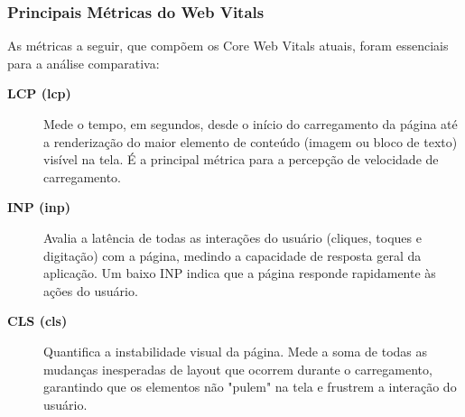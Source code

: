 \subsubsection{Principais Métricas do Web Vitals}
As métricas a seguir, que compõem os Core Web Vitals atuais, foram essenciais para a análise comparativa:
\begin{description}
    \item[\textbf{LCP (\acrfull{lcp})}] Mede o tempo, em segundos, desde o início do carregamento da página até a renderização do maior elemento de conteúdo (imagem ou bloco de texto) visível na tela. É a principal métrica para a percepção de velocidade de carregamento.
    \item[\textbf{INP (\acrfull{inp})}] Avalia a latência de todas as interações do usuário (cliques, toques e digitação) com a página, medindo a capacidade de resposta geral da aplicação. Um baixo INP indica que a página responde rapidamente às ações do usuário.
    \item[\textbf{CLS (\acrfull{cls})}] Quantifica a instabilidade visual da página. Mede a soma de todas as mudanças inesperadas de layout que ocorrem durante o carregamento, garantindo que os elementos não "pulem" na tela e frustrem a interação do usuário.
\end{description}


